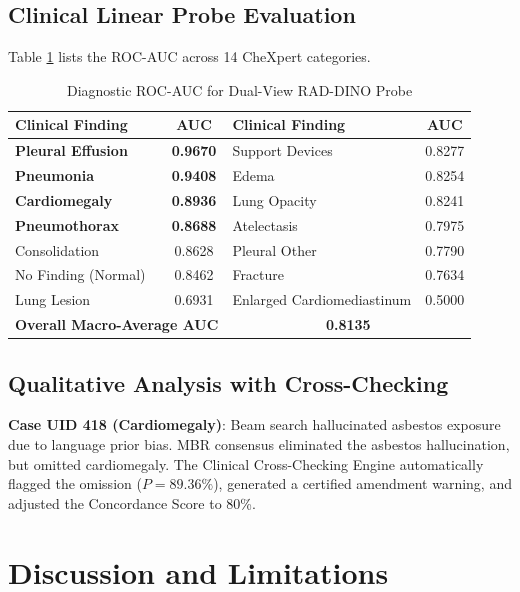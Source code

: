 \documentclass[12pt,a4paper]{report}
\begin{document}
\section{Clinical Linear Probe Evaluation}
Table \ref{tab:probe_auc} lists the ROC-AUC across 14 CheXpert categories.

\begin{table}[htbp]
\centering
\caption{Diagnostic ROC-AUC for Dual-View RAD-DINO Probe}
\label{tab:probe_auc}
\begin{tabular}{lc|lc}
\toprule
\textbf{Clinical Finding} & \textbf{AUC} & \textbf{Clinical Finding} & \textbf{AUC} \\
\midrule
\textbf{Pleural Effusion} & \textbf{0.9670} & Support Devices & 0.8277 \\
\textbf{Pneumonia} & \textbf{0.9408} & Edema & 0.8254 \\
\textbf{Cardiomegaly} & \textbf{0.8936} & Lung Opacity & 0.8241 \\
\textbf{Pneumothorax} & \textbf{0.8688} & Atelectasis & 0.7975 \\
Consolidation & 0.8628 & Pleural Other & 0.7790 \\
No Finding (Normal) & 0.8462 & Fracture & 0.7634 \\
Lung Lesion & 0.6931 & Enlarged Cardiomediastinum & 0.5000 \\
\midrule
\multicolumn{2}{l}{\textbf{Overall Macro-Average AUC}} & \multicolumn{2}{c}{\textbf{0.8135}} \\
\bottomrule
\end{tabular}
\end{table}

\section{Qualitative Analysis with Cross-Checking}
\textbf{Case UID 418 (Cardiomegaly)}: Beam search hallucinated asbestos exposure due to language prior bias. MBR consensus eliminated the asbestos hallucination, but omitted cardiomegaly. The Clinical Cross-Checking Engine automatically flagged the omission ($P = 89.36\%$), generated a certified amendment warning, and adjusted the Concordance Score to 80\%.

\chapter{Discussion and Limitations}
\end{document}
